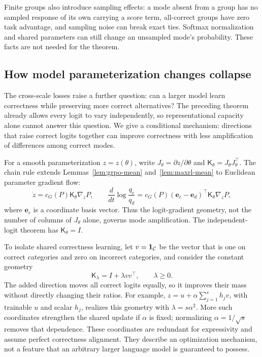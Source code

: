 Finite groups also introduce sampling effects: a mode absent from
a group has no sampled response of its own carrying a score term,
all-correct groups have zero task advantage, and sampling noise can break exact
ties. Softmax normalization and shared parameters can still change an
unsampled mode's probability. These facts are not needed for
the theorem.

\subsection{How model parameterization changes collapse}
\label{app:theory-size}

The cross-scale losses raise a further question: can a larger model learn
correctness while preserving more correct alternatives? The preceding theorem
already allows every logit to vary independently, so representational capacity
alone cannot answer this question. We give a conditional mechanism: directions
that raise correct logits together can improve correctness with less
amplification of differences among correct modes.

For a smooth parameterization $z=z(\theta)$, write
$J_\theta=\partial z/\partial\theta$ and
$\mathsf K_\theta=J_\theta J_\theta^\top$. The chain rule extends
Lemmas~\ref{lem:grpo-mean} and~\ref{lem:maxrl-mean} to Euclidean parameter
gradient flow:
\begin{equation}
 \dot z=c_G(P)\mathsf K_\theta\nabla_zP,
 \qquad
 \frac{d}{dt}\log\frac{q_c}{q_d}
 =c_G(P)(\mathbf e_c-\mathbf e_d)^\top\mathsf K_\theta\nabla_zP,
 \label{eq:parameterized-collapse}
\end{equation}
where $\mathbf e_c$ is a coordinate basis vector. Thus the logit-gradient geometry,
not the number of columns of $J_\theta$ alone, governs mode amplification.
The independent-logit theorem has $\mathsf K_\theta=I$.

To isolate shared correctness learning, let $v=\mathbf 1_{\mathcal C}$ be the
vector that is one on correct categories and zero on incorrect categories,
and consider the constant geometry
\begin{equation}
 \mathsf K_\lambda=I+\lambda vv^\top,\qquad \lambda\ge0.
 \label{eq:shared-correctness-kernel}
\end{equation}
The added direction moves all correct logits equally, so it improves their
mass without directly changing their ratios. For example,
$z=u+\alpha\sum_{j=1}^s h_jv$, with trainable $u$ and scalar $h_j$, realizes
this geometry with $\lambda=s\alpha^2$. More such coordinates strengthen the
shared update if $\alpha$ is fixed; normalizing $\alpha=1/\sqrt{s}$ removes
that dependence. These coordinates are redundant for expressivity and assume
perfect correctness alignment. They describe an optimization mechanism, not
a feature that an arbitrary larger language model is guaranteed to possess.

